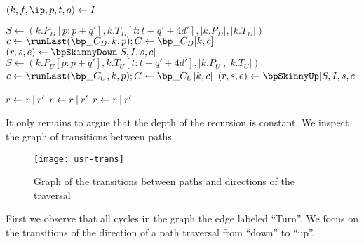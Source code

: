 \begin{algorithm}
\begin{algorithmic}
 
	\State $(k, f, \ip, p, t, o) \gets I$
	
	 
		\State $S \gets (k.P_D[p:p+q'], k.T_D[t:t + q' + 4d'], |k.P_D|, |k.T_D|)$
		\State $c \gets \runLast(\bp\_C_D, k, p); C \gets \bp\_C_D[k, c]$
		\State $(r, s, e) \gets \bpSkinnyDown[S, I, s, c]$
	 
		\State $S \gets (k.P_U[p:p+q'], k.T_U[t:t + q' + 4d'], |k.P_U|, |k.T_U|)$
		\State $c \gets \runLast(\bp\_C_U, k, p); C \gets \bp\_C_U[k, c]$
		\State $(r, s, e) \gets \bpSkinnyUp[S, I, s, c]$
	\EndIf
	
	 
		\State $r \gets r \mathbin{|} r'$
	 
		\State $r \gets r \mathbin{|} r'$
	 
		\State $r \gets r \mathbin{|} r'$
	\EndIf
	
	\State {}
\EndFunction
\end{algorithmic}
\end{algorithm}

\bigbreak

It only remains to argue that the depth of the recursion is constant.
We inspect the graph of transitions between paths.

\begin{figure}[h]
	\centering
	\texttt{[image: usr-trans]}
	\caption{Graph of the transitions between paths and directions of the traversal}
\end{figure}

First we observe that all cycles in the graph the edge labeled ``Turn''.
We focus on the transitions of the direction of a path traversal from ``down'' to ``up''.


